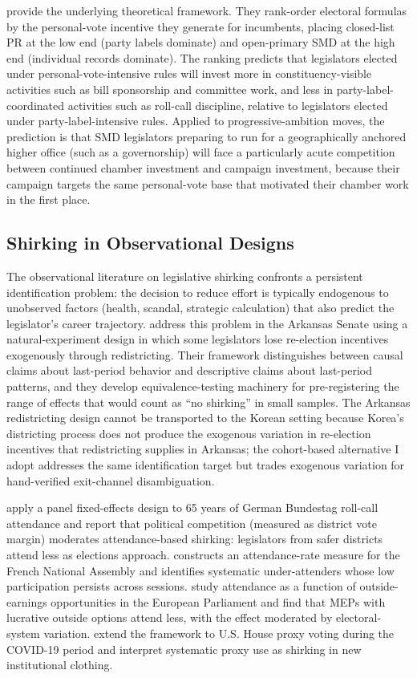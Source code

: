 \documentclass[11pt]{article}
\begin{document}
\citet{careyshugart1995} provide the underlying theoretical framework. They rank-order electoral formulas by the personal-vote incentive they generate for incumbents, placing closed-list PR at the low end (party labels dominate) and open-primary SMD at the high end (individual records dominate). The ranking predicts that legislators elected under personal-vote-intensive rules will invest more in constituency-visible activities such as bill sponsorship and committee work, and less in party-label-coordinated activities such as roll-call discipline, relative to legislators elected under party-label-intensive rules. Applied to progressive-ambition moves, the prediction is that SMD legislators preparing to run for a geographically anchored higher office (such as a governorship) will face a particularly acute competition between continued chamber investment and campaign investment, because their campaign targets the same personal-vote base that motivated their chamber work in the first place.

\subsection{Shirking in Observational Designs}

The observational literature on legislative shirking confronts a persistent identification problem: the decision to reduce effort is typically endogenous to unobserved factors (health, scandal, strategic calculation) that also predict the legislator's career trajectory. \citet{titiunikfeher2017} address this problem in the Arkansas Senate using a natural-experiment design in which some legislators lose re-election incentives exogenously through redistricting. Their framework distinguishes between causal claims about last-period behavior and descriptive claims about last-period patterns, and they develop equivalence-testing machinery for pre-registering the range of effects that would count as ``no shirking'' in small samples. The Arkansas redistricting design cannot be transported to the Korean setting because Korea's districting process does not produce the exogenous variation in re-election incentives that redistricting supplies in Arkansas; the cohort-based alternative I adopt addresses the same identification target but trades exogenous variation for hand-verified exit-channel disambiguation.

\citet{frankstadelmann2021} apply a panel fixed-effects design to 65 years of German Bundestag roll-call attendance and report that political competition (measured as district vote margin) moderates attendance-based shirking: legislators from safer districts attend less as elections approach. \citet{gavoille2018} constructs an attendance-rate measure for the French National Assembly and identifies systematic under-attenders whose low participation persists across sessions. \citet{gagliarducci2016} study attendance as a function of outside-earnings opportunities in the European Parliament and find that MEPs with lucrative outside options attend less, with the effect moderated by electoral-system variation. \citet{mixontorgler2023} extend the framework to U.S. House proxy voting during the COVID-19 period and interpret systematic proxy use as shirking in new institutional clothing.
\end{document}

